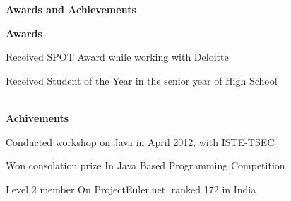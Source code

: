 \documentclass[a4paper,12pt,final]{memoir}
\newcommand{\Sep}{\vspace{1.5em}}
\newcommand{\SmallSep}{\vspace{0.5em}}
\newcommand{\CVSection}[1]
	{\Large\textbf{#1}\par
	\SmallSep\normalsize\normalfont}
\newcommand{\CVItem}[1]
	{\textbf{\color{Plum} #1}}
\begin{document}
\CVSection{Awards and Achievements}
\CVItem{Awards}\SmallSep\\
\begin{minipage}{13.5cm}
	\begin{compactitem}[\color{Plum}$\circ$]
		{\footnotesize
			\item Received SPOT Award while working with Deloitte
			\item Received Student of the Year in the senior year of High School}
	\end{compactitem}
\end{minipage}
\SmallSep\\
\CVItem{Achivements}\SmallSep\\
\begin{minipage}{13.5cm}
	\begin{compactitem}[\color{Plum}$\circ$]
		{\footnotesize
			\item Conducted workshop on Java in April 2012, with ISTE-TSEC
			\item Won consolation prize In Java Based Programming Competition
			\item Level 2 member On ProjectEuler.net, ranked 172 in India}
	\end{compactitem}
\end{minipage}
\Sep\\
\end{document}
